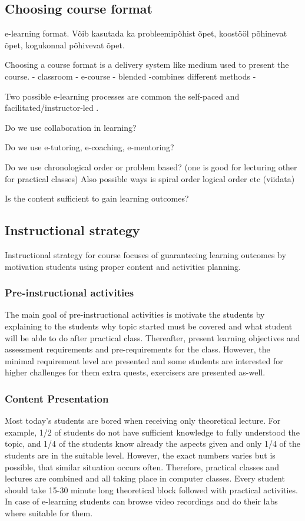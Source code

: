 \subsection{Choosing course format}

e-learning format. Võib kasutada ka probleemipõhist õpet, koostööl põhinevat õpet, kogukonnal põhivevat õpet.

Choosing a course format is a delivery system like medium used to present the course.
- classroom
- e-course
- blended -combines different methods
- 




Two possible e-learning processes are common the self-paced and facilitated/instructor-led \citep[p.~10]{food2011learning}.

Do we use collaboration in learning? 

Do we use  e-tutoring, e-coaching, e-mentoring?

Do we use chronological order or problem based? (one is good for lecturing other for practical classes) Also possible ways is spiral order logical order etc {\color{red} (viidata) }

Is the content sufficient to gain learning outcomes?



\subsection{Instructional strategy}
Instructional strategy for course focuses of guaranteeing learning outcomes by motivation students using proper content and activities planning.


\subsubsection{Pre-instructional activities}
The main goal of pre-instructional activities is motivate the students by explaining to the students why topic started must be covered and what student will be able to do after practical class. Thereafter, present learning objectives and assessment requirements and pre-requirements for the class. However, the minimal requirement level are presented and some students are interested for higher challenges for them extra quests, exercisers are presented as-well.


\subsubsection{Content Presentation}
Most today’s students are bored when receiving only theoretical lecture. For example, 1/2 of students do not have sufficient knowledge to fully understood the topic, and 1/4 of the students know already the aspects given and only 1/4 of the students are in the suitable level.  However, the exact numbers varies but is possible, that similar situation occurs often. Therefore, practical classes and lectures are combined and all taking place in computer classes. Every student should take 15-30 minute long theoretical block followed with practical activities. In case of e-learning students can browse video recordings and do their labs where suitable for them.

